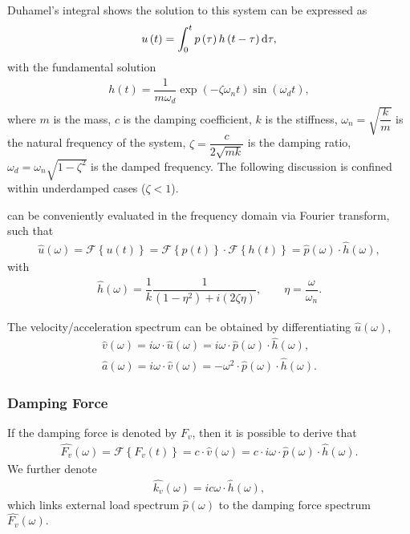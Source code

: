 Duhamel's integral shows the solution to this system can be expressed as
\begin{gather}\label{eq:duhamel}
u\left(t\right)=\int_{0}^{t}p\left(\tau\right)h\left(t-\tau\right)\mathrm{d}\tau,
\end{gather}
with the fundamental solution
\begin{gather}
h\left(t\right)=\dfrac{1}{m\omega_d}\exp\left(-\zeta\omega_nt\right)\sin\left(\omega_dt\right),
\end{gather}
where $m$ is the mass, $c$ is the damping coefficient, $k$ is the stiffness, $\omega_n=\sqrt{\dfrac{k}{m}}$ is the natural frequency of the system, $\zeta=\dfrac{c}{2\sqrt{mk}}$ is the damping ratio, $\omega_d=\omega_n\sqrt{1-\zeta^2}$ is the damped frequency. The following discussion is confined within underdamped cases ($\zeta<1$).

 can be conveniently evaluated in the frequency domain via Fourier transform, such that
\begin{gather}
\hat{u}\left(\omega\right)=\mathscr{F}\left\{u\left(t\right)\right\}=\mathscr{F}\left\{p\left(t\right)\right\}\cdot\mathscr{F}\left\{h\left(t\right)\right\}=\hat{p}\left(\omega\right)\cdot\hat{h}\left(\omega\right),
\end{gather}
with
\begin{gather}\label{eq:analytical_transfer}
\hat{h}\left(\omega\right)=\dfrac{1}{k}\dfrac{1}{\left(1-\eta^2\right)+i\left(2\zeta\eta\right)},\qquad\eta=\dfrac{\omega}{\omega_n}.
\end{gather}

The velocity/acceleration spectrum can be obtained by differentiating $\hat{u}\left(\omega\right)$,
\begin{gather}
\hat{v}\left(\omega\right)=i\omega\cdot{}\hat{u}\left(\omega\right)=i\omega\cdot{}\hat{p}\left(\omega\right)\cdot\hat{h}\left(\omega\right),\\
\hat{a}\left(\omega\right)=i\omega\cdot{}\hat{v}\left(\omega\right)=-\omega^2\cdot{}\hat{p}\left(\omega\right)\cdot\hat{h}\left(\omega\right).
\end{gather}
\subsubsection{Damping Force}
If the damping force is denoted by $F_v$, then it is possible to derive that
\begin{gather}
\hat{F_v}\left(\omega\right)=\mathscr{F}\left\{F_v\left(t\right)\right\}=c\cdot{}\hat{v}\left(\omega\right)=c\cdot{}i\omega\cdot{}\hat{p}\left(\omega\right)\cdot\hat{h}\left(\omega\right).
\end{gather}
We further denote
\begin{gather}
\hat{k_v}\left(\omega\right)=ic\omega\cdot\hat{h}\left(\omega\right),
\end{gather}
which links external load spectrum $\hat{p}\left(\omega\right)$ to the damping force spectrum $\hat{F_v}\left(\omega\right)$.


